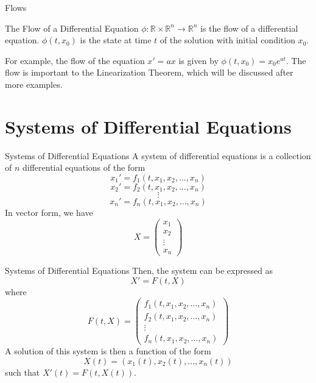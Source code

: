 \documentclass{beamer}
\begin{document}
\begin{frame}{Flows}
    \begin{block}{The Flow of a Differential Equation}
        $\phi: \mathbb{R} \times \mathbb{R}^n \to \mathbb{R}^n$ is the flow of a differential equation. $\phi(t,x_0)$ is the state at time $t$ of the solution with initial condition $x_0$.
    \end{block}
    For example, the flow of the equation $x' = ax$ is given by $\phi(t,x_0) = x_0 e^{at}$. The flow is important to the Linearization Theorem, which will be discussed after more examples.
\end{frame}

\section{Systems of Differential Equations}

\begin{frame}{Systems of Differential Equations}
    A system of differential equations is a collection of $n$ differential equations of the form
    \[x_1' = f_1(t, x_1, x_2, \ldots, x_n)\]
    \[x_2' = f_2(t, x_1, x_2, \ldots, x_n)\]
    \[\vdots\]
    \[x_n' = f_n(t, x_1, x_2, \ldots, x_n)\]
    In vector form, we have
    \[
        X=
        \begin{pmatrix}
            x_1 \\
            x_2 \\
            \vdots \\
            x_n
        \end{pmatrix}
    \]
\end{frame}

\begin{frame}{Systems of Differential Equations}
    Then, the system can be expressed as
    \[
        X' = F(t, X)
    \]
    where
    \[F(t, X)=
    \begin{pmatrix}
        f_1(t, x_1, x_2, \ldots, x_n) \\
        f_2(t, x_1, x_2, \ldots, x_n) \\
        \vdots \\
        f_n(t, x_1, x_2, \ldots, x_n)
    \end{pmatrix}
    \]
    A solution of this system is then a function of the form
    \[X(t)=(x_1(t), x_2(t), \ldots, x_n(t))\]
    such that $X'(t) = F(t, X(t))$.
\end{frame}
\end{document}
